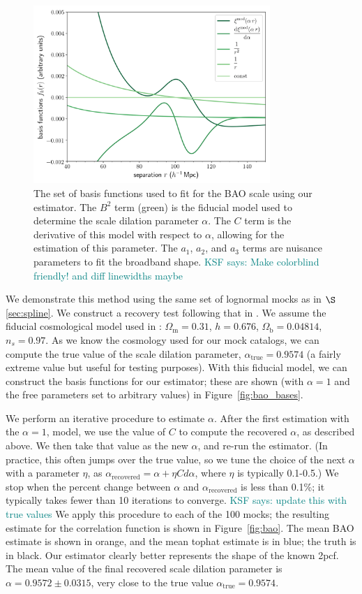 \documentclass[modern]{aastex62}
\newcommand{\cf}{2pcf\xspace} %
\newcommand{\KSF}[1]{\textcolor{teal}{KSF says: #1}}
\begin{document}
\label{fig:bao_bases}
\begin{figure}[ht]
\centering
    \includegraphics[width=0.8\textwidth]{bao_bases}
    \caption{The set of basis functions used to fit for the BAO scale using our estimator. The $B^2$ term (green) is the fiducial model used to determine the scale dilation parameter $\alpha$. The $C$ term is the derivative of this model with respect to $\alpha$, allowing for the estimation of this parameter. The $a_1$, $a_2$, and $a_3$ terms are nuisance parameters to fit the broadband shape. \KSF{Make colorblind friendly! and diff linewidths maybe}}
\end{figure}

We demonstrate this method using the same set of lognormal mocks as in $\S$\ref{sec:spline}.
We construct a recovery test following that in \cite{Hinton2019}.
We assume the fiducial cosmological model used in \cite{Beutler2017}: $\Omega_{\text{m}} = 0.31$, $h = 0.676$, $\Omega_{\text{b}} = 0.04814$, $n_s = 0.97$. 
As we know the cosmology used for our mock catalogs, we can compute the true value of the scale dilation parameter, $\alpha_{\text{true}}=0.9574$ (a fairly extreme value but useful for testing purposes).
With this fiducial model, we can construct the basis functions for our estimator; these are shown (with $\alpha=1$ and the free parameters set to arbitrary values) in Figure~\ref{fig:bao_bases}.

We perform an iterative procedure to estimate $\alpha$.
After the first estimation with the $\alpha=1$, model, we use the value of $C$ to compute the recovered $\alpha$, as described above.
We then take that value as the new $\alpha$, and re-run the estimator.
(In practice, this often jumps over the true value, so we tune the choice of the next $\alpha$ with a parameter $\eta$, as $\alpha_{\text{recovered}} = \alpha + \eta C d\alpha$, where $\eta$ is typically 0.1-0.5.)
We stop when the percent change between $\alpha$ and $\alpha_{\text{recovered}}$ is less than 0.1\%; it typically takes fewer than 10 iterations to converge. \KSF{update this with true values}
We apply this procedure to each of the 100 mocks; the resulting estimate for the correlation function is shown in Figure~\ref{fig:bao}.
The mean BAO estimate is shown in orange, and the mean tophat estimate is in blue; the truth is in black.
Our estimator clearly better represents the shape of the known \cf.
The mean value of the final recovered scale dilation parameter is $\alpha=0.9572 \pm 0.0315$, very close to the true value $\alpha_{\text{true}}=0.9574$.
\end{document}
